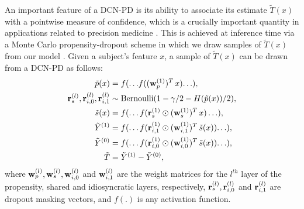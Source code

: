 \documentclass{article}
\begin{document}
An important feature of a DCN-PD is its ability to associate its estimate $\tilde{T}(x)$ with a pointwise measure of confidence, which is a crucially important quantity in applications related to precision medicine \cite{athey2016recursive, wager2015estimation}. This is achieved at inference time via a Monte Carlo propensity-dropout scheme in which we draw samples of $\tilde{T}(x)$ from our model \cite{gal2016dropout}. Given a subject's feature $x$, a sample of $\tilde{T}(x)$ can be drawn from a DCN-PD as follows:
\begin{align}
\tilde{p}(x) &= f(.\,.\,.f(({\bf w}^{(1)}_p)^T\,x).\,.\,.), \nonumber \\
{\bf r}^{(l)}_{s}, {\bf r}^{(l)}_{i,0}, {\bf r}^{(l)}_{i,1} &\sim \mbox{Bernoulli}(1-\gamma/2-H(\tilde{p}(x))/2),\nonumber \\
\tilde{s}(x) &= f(.\,.\,.\, f({\bf r}^{(1)}_{s}\odot({\bf w}^{(1)}_s)^T\,x)\,.\,.\,.), \nonumber \\
\tilde{Y}^{(1)} &= f(.\,.\,.\,f({\bf r}^{(1)}_{i,1}\odot ({\bf w}^{(1)}_{i,1})^T\,\tilde{s}(x)).\,.\,.), \nonumber \\
\tilde{Y}^{(0)} &= f(.\,.\,.\, f({\bf r}^{(1)}_{i,0}\odot({\bf w}^{(1)}_{i,0})^T\,\tilde{s}(x)).\,.\,.), \nonumber \\
\tilde{T}       &= \tilde{Y}^{(1)}-\tilde{Y}^{(0)},\nonumber 
\end{align} 
where ${\bf w}^{(l)}_p, {\bf w}^{(l)}_s, {\bf w}^{(l)}_{i,0}$ and ${\bf w}^{(l)}_{i,1}$ are the weight matrices for the $l^{th}$ layer of the propensity, shared and idiosyncratic layers, respectively, ${\bf r}^{(l)}_s, {\bf r}^{(l)}_{i,0}$ and ${\bf r}^{(l)}_{i,1}$ are dropout masking vectors, and $f(.)$ is any activation function.
\end{document}
